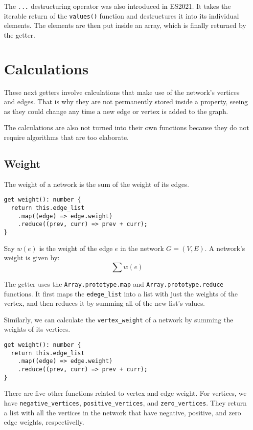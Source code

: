 The \texttt{...} destructuring operator was also introduced in ES2021.
It takes the iterable return of the \texttt{values()}
function and destructures it into its individual elements.
The elements are then put inside an array, which is finally returned by the getter.

\section{Calculations}
These next getters involve calculations that make use of the network's vertices and edges.
That is why they are not permanently stored inside a property,
seeing as they could change any time a new edge or vertex is added to the graph.

The calculations are also not turned into their own functions because they do not
require algorithms that are too elaborate.

\subsection{Weight}

The weight of a network is the sum of the weight of its edges.
\begin{verbatim}
get weight(): number {
  return this.edge_list
    .map((edge) => edge.weight)
    .reduce((prev, curr) => prev + curr);
}
\end{verbatim}
Say $w(e)$ is the weight of the edge $e$ in the network $G=(V,E)$. A network's weight is given by:
$$\sum{w(e)}$$

The getter uses the \texttt{Array.prototype.map}
and \texttt{Array.prototype.reduce} functions.
It first maps the \texttt{edege_list}
into a list with just the weights of the vertex,
and then reduces it by summing all of the new list's values.

Similarly, we can calculate the \texttt{vertex_weight} of a network
by summing the weights of its vertices.
\begin{verbatim}
get weight(): number {
  return this.edge_list
    .map((edge) => edge.weight)
    .reduce((prev, curr) => prev + curr);
}
\end{verbatim}

There are five other functions related to vertex and edge weight.
For vertices, we have \texttt{negative_vertices}, \texttt{positive_vertices},
and \texttt{zero_vertices}. They return a list with all the vertices
in the network that have negative, positive,
and zero edge weights, respectivelly.

